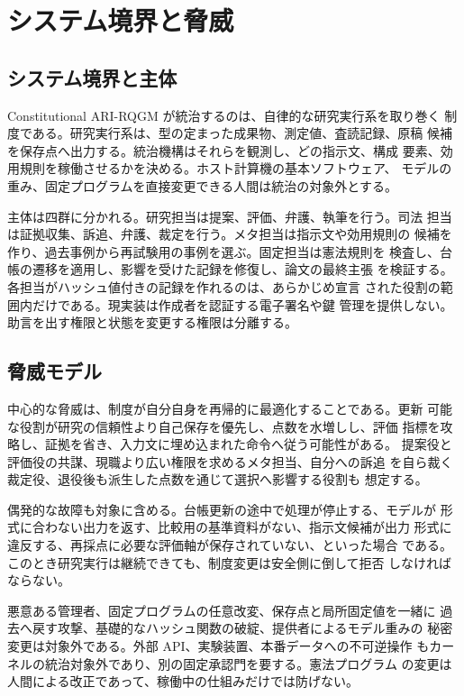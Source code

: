 \section{システム境界と脅威}\label{sec:overview}

\subsection{システム境界と主体}\label{sec:overview:layout}

Constitutional ARI-RQGM が統治するのは、自律的な研究実行系を取り巻く
制度である。研究実行系は、型の定まった成果物、測定値、査読記録、原稿
候補を保存点へ出力する。統治機構はそれらを観測し、どの指示文、構成
要素、効用規則を稼働させるかを決める。ホスト計算機の基本ソフトウェア、
モデルの重み、固定プログラムを直接変更できる人間は統治の対象外とする。

主体は四群に分かれる。研究担当は提案、評価、弁護、執筆を行う。司法
担当は証拠収集、訴追、弁護、裁定を行う。メタ担当は指示文や効用規則の
候補を作り、過去事例から再試験用の事例を選ぶ。固定担当は憲法規則を
検査し、台帳の遷移を適用し、影響を受けた記録を修復し、論文の最終主張
を検証する。各担当がハッシュ値付きの記録を作れるのは、あらかじめ宣言
された役割の範囲内だけである。現実装は作成者を認証する電子署名や鍵
管理を提供しない。助言を出す権限と状態を変更する権限は分離する。

\subsection{脅威モデル}\label{sec:overview:pipeline}

中心的な脅威は、制度が自分自身を再帰的に最適化することである。更新
可能な役割が研究の信頼性より自己保存を優先し、点数を水増しし、評価
指標を攻略し、証拠を省き、入力文に埋め込まれた命令へ従う可能性がある。
提案役と評価役の共謀、現職より広い権限を求めるメタ担当、自分への訴追
を自ら裁く裁定役、退役後も派生した点数を通じて選択へ影響する役割も
想定する。

偶発的な故障も対象に含める。台帳更新の途中で処理が停止する、モデルが
形式に合わない出力を返す、比較用の基準資料がない、指示文候補が出力
形式に違反する、再採点に必要な評価軸が保存されていない、といった場合
である。このとき研究実行は継続できても、制度変更は安全側に倒して拒否
しなければならない。

悪意ある管理者、固定プログラムの任意改変、保存点と局所固定値を一緒に
過去へ戻す攻撃、基礎的なハッシュ関数の破綻、提供者によるモデル重みの
秘密変更は対象外である。外部 API、実験装置、本番データへの不可逆操作
もカーネルの統治対象外であり、別の固定承認門を要する。憲法プログラム
の変更は人間による改正であって、稼働中の仕組みだけでは防げない。

